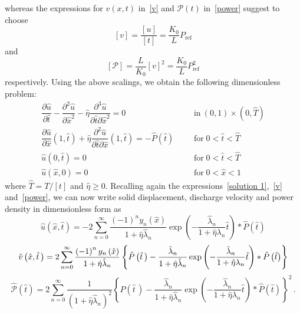 \documentclass[12pt,a4paper]{amsart}
\theoremstyle{definition}
\newcommand{\hu}{\hat{u}}
\newcommand{\hx}{\hat{x}}
\newcommand{\hatt}{\hat{t}}
\newcommand{\heta}{\hat{\eta}}
\newcommand{\hv}{\hat{v}}
\newcommand{\hlambda}{\hat{\lambda}}
\newcommand{\hT}{\hat{T}}
\newcommand{\hP}{\hat{P}}
\begin{document}
whereas the expressions for $v(x,t)$ in~\eqref{v} and $\mathcal P(t)$ in~\eqref{power} suggest to choose
\begin{equation}\label{eq:scalf_velocity}
[v] = \frac{[u]}{[t]} =  \frac{K_0}{L}P_{\text{ref}}
\end{equation}
and
\begin{equation}\label{eq:scalf_power_density}
[\mathcal P] = \frac{L}{K_0}[v]^2 =  \frac{K_0}{L}P_{\text{ref}}^2
\end{equation}
respectively. Using the above scalings, we obtain the following dimensionless problem:
\begin{subequations}
\label{eq:1d_problem_per_hu}
\begin{align}
\dfrac{\partial \hu}{\partial \hatt}- \dfrac{\partial ^{2} \hu}{\partial \hx ^{2}}%
-\heta \dfrac{\partial ^{3}\hu}{\partial \hatt\partial \hx ^{2}}=0 &  & & %
\mbox{in}\ (0,1)\times (0,\hT) \label{eq:balance_for_hu} \\[3mm]
 \dfrac{\partial \hu}{\partial \hx}\left( 1,\hatt\right) +\heta \dfrac{\partial
^{2}\hu}{\partial \hatt\partial \hx}\left( 1, \hatt\right) =-\hP\left( \hatt\right)
& & &
\mbox{for}\;0<\hatt<\hT \label{eq:bc_hx_1} \\
\hu\left( 0,\hatt\right) =0 & & & \mbox{for}\;0<\hatt<\hT \label{eq:bc_hx_0} \\
\hu\left( \hx,0\right) =0 & & & \mbox{for}\;0<\hx<1 \label{eq:ic h}
\end{align}%
\end{subequations}
where $\hT = T/[t]$ and $\heta \geq 0$. Recalling again the expressions~\eqref{solution 1},~\eqref{v} and~\eqref{power}, we can now write solid displacement, discharge velocity and power density in dimensionless form as
\begin{equation}
\hu\left( \hx,\hatt\right) =-2\sum_{n=0}^{\infty }\frac{\left(
-1\right) ^{n}y_{n}\left( \hx\right) }{1+\heta \hlambda _{n}}\exp \left( -%
\frac{ \hlambda _{n}}{1+\heta \lambda _{n}}\hatt\right) \ast \hP\left(
\hatt\right)   \label{solution 1hat}
\end{equation}%
\begin{equation} \label{hv}
\hv\left( \hx,\hatt\,\right) =2\sum_{n=0}^{\infty }\frac{\left(
-1\right) ^{n}y_{n}\left( \hx\right) }{1+\heta \hlambda _{n}} \left\{ \hat{P}\left( \hatt\,\right) -\frac{%
\hlambda _{n}}{1+\heta \hlambda _{n}}\exp \left( -%
\frac{ \hlambda _{n}}{1+\heta \lambda _{n}}\hatt\right) \ast \hP\left(
\hatt\right)\right\}
\end{equation}%
\begin{equation}\label{power hat}
\hat{\mathcal{P}}\left( \hatt\right) =2\sum_{n=0}^{\infty }\frac{1}{\left(
1+\heta \hlambda _{n}\right) ^{2}}\left\{ \hat{P}\left( \hatt\,\right) -\frac{\hlambda _{n}%
}{1+\heta \hlambda _{n}}\exp \left( -%
\frac{ \hlambda _{n}}{1+\heta \lambda _{n}}\hatt\right) \ast \hP\left(
\hatt\right) \right\} ^{2}\,.
\end{equation}
\end{document}
